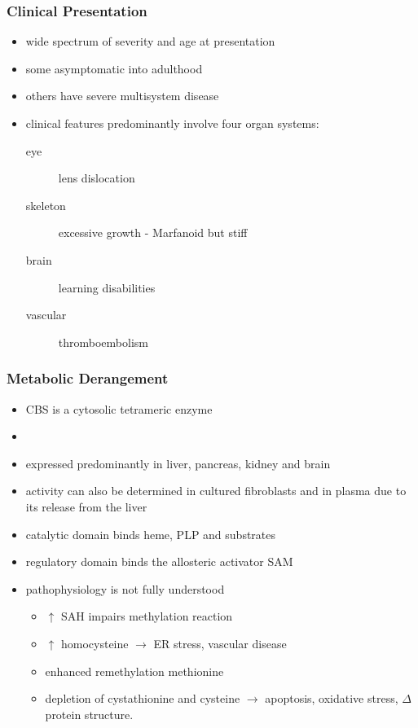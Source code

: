 \documentclass{scrartcl}
\begin{document}
\subsubsection{Clinical Presentation}
\label{sec:org1252d31}
\begin{itemize}
\item wide spectrum of severity and age at presentation
\item some asymptomatic into adulthood
\item others have severe multisystem disease
\item clinical features predominantly involve four organ systems:
\begin{description}
\item[{eye}] lens dislocation
\item[{skeleton}] excessive growth - Marfanoid but stiff
\item[{brain}] learning disabilities
\item[{vascular}] thromboembolism
\end{description}
\end{itemize}
\subsubsection{Metabolic Derangement}
\label{sec:org710b896}
\begin{itemize}
\item CBS is a cytosolic tetrameric enzyme
\item {}
\item expressed predominantly in liver, pancreas, kidney and brain
\item activity can also be determined in cultured fibroblasts and in plasma
due to its release from the liver
\item catalytic domain binds heme, PLP and substrates
\item regulatory domain binds the allosteric activator SAM
\item pathophysiology is not fully understood
\begin{itemize}
\item \(\uparrow\) SAH impairs methylation reaction
\item \(\uparrow\) homocysteine \(\to\) ER stress, vascular disease
\item enhanced remethylation methionine
\item depletion of cystathionine and cysteine \(\to\) apoptosis, oxidative
stress, \(\Delta\) protein structure.
\end{itemize}
\end{itemize}
\end{document}
